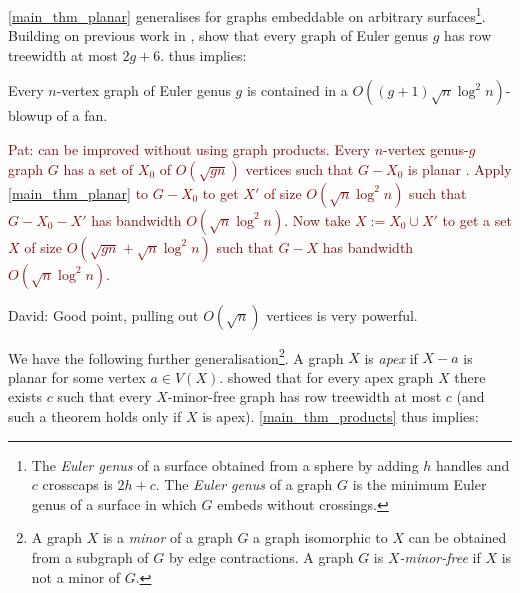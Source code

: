 \documentclass{patmorin}
\newcommand{\david}[1]{{\color{orange} David: #1}}
\newcommand{\pat}[1]{\textcolor{Maroon}{Pat: #1}}
\newcommand{\defin}[1]{\emph{\textcolor{brightmaroon}{#1}}}
\begin{document}

\cref{main_thm_planar} generalises for graphs embeddable on arbitrary surfaces\footnote{The \defin{Euler genus} of a surface obtained from a sphere by adding $h$ handles and $c$ crosscaps is $2h+c$. The \defin{Euler genus} of a graph $G$ is the minimum Euler genus of a surface in which $G$ embeds without crossings.}.
Building on previous work in \citep{dujmovic.joret.ea:planar,ueckerdt.wood.ea:improved}, \citet{distel.hickingbotham.ea:improved} show that every graph of Euler genus $g$ has row treewidth at most $2g+6$.  thus implies:

\begin{thm}\label{genus_products}
Every $n$-vertex graph of Euler genus $g$ is contained in a $O((g+1)\sqrt{n}\log^2 n)$-blowup of a fan.
\end{thm}

\pat{ can be improved without using graph products. Every $n$-vertex genus-$g$ graph $G$ has a set of $X_0$ of $O(\sqrt{gn})$ vertices such that $G-X_0$ is planar \cite{eppstein:dynamic}. Apply \cref{main_thm_planar} to $G-X_0$ to get $X'$ of size $O(\sqrt{n}\log^2 n)$ such that $G-X_0-X'$ has bandwidth $O(\sqrt{n}\log^2 n)$.  Now take $X:=X_0\cup X'$ to get a set $X$ of size $O(\sqrt{gn} + \sqrt{n}\log^2 n)$ such that $G-X$ has bandwidth $O(\sqrt{n}\log^2 n)$.}

\david{Good point, pulling out $O(\sqrt{n})$ vertices is very powerful. }

We have the following further generalisation\footnote{A graph $X$ is a \defin{minor} of a graph $G$ a graph isomorphic to $X$ can be obtained from a subgraph of $G$ by edge contractions. A graph $G$ is \defin{$X$-minor-free} if $X$ is not a minor of $G$.}.
A graph $X$ is \defin{apex} if $X-a$ is planar for some vertex $a\in V(X)$. \citet{dujmovic.joret.ea:planar} showed that for every apex graph $X$ there exists $c$ such that every $X$-minor-free graph has row treewidth at most $c$ (and such a theorem holds only if $X$ is apex). \cref{main_thm_products} thus implies:
\end{document}
